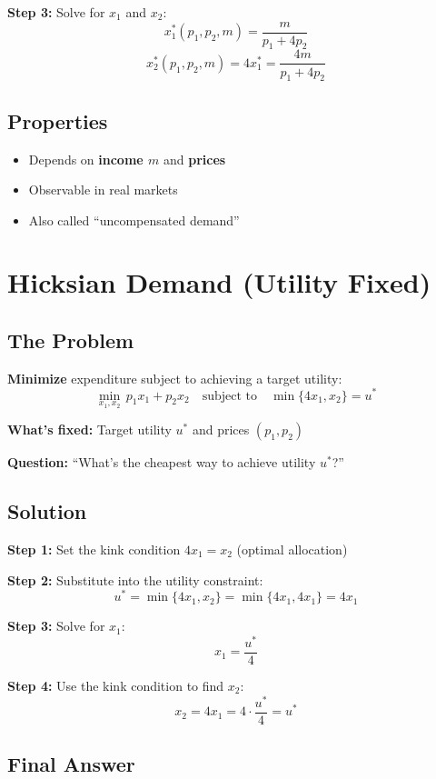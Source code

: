 \documentclass[11pt]{article}
\begin{document}
\textbf{Step 3:} Solve for $x_1$ and $x_2$:
\[
\boxed{x_1^*(p_1, p_2, m) = \frac{m}{p_1 + 4p_2}}
\]
\[
\boxed{x_2^*(p_1, p_2, m) = 4x_1^* = \frac{4m}{p_1 + 4p_2}}
\]

\subsection{Properties}

\begin{itemize}
    \item Depends on \textbf{income $m$} and \textbf{prices}
    \item Observable in real markets
    \item Also called ``uncompensated demand''
\end{itemize}

\section{Hicksian Demand (Utility Fixed)}

\subsection{The Problem}

\textbf{Minimize} expenditure subject to achieving a target utility:
\[
\min_{x_1, x_2} \, p_1 x_1 + p_2 x_2 \quad \text{subject to} \quad \min\{4x_1, x_2\} = u^*
\]

\textbf{What's fixed:} Target utility $u^*$ and prices $(p_1, p_2)$

\textbf{Question:} ``What's the cheapest way to achieve utility $u^*$?''

\subsection{Solution}

\textbf{Step 1:} Set the kink condition $4x_1 = x_2$ (optimal allocation)

\textbf{Step 2:} Substitute into the utility constraint:
\[
u^* = \min\{4x_1, x_2\} = \min\{4x_1, 4x_1\} = 4x_1
\]

\textbf{Step 3:} Solve for $x_1$:
\[
x_1 = \frac{u^*}{4}
\]

\textbf{Step 4:} Use the kink condition to find $x_2$:
\[
x_2 = 4x_1 = 4 \cdot \frac{u^*}{4} = u^*
\]

\subsection{Final Answer}
\end{document}
